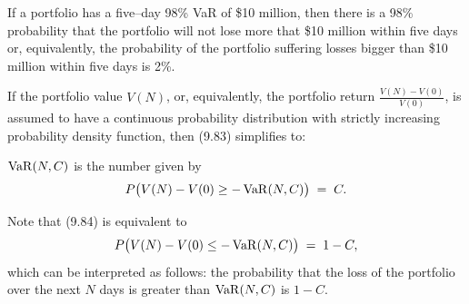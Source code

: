 \begin{examplex}
If a portfolio has a five--day 98\% VaR of \$10 million, then there is a 98\%
probability that the portfolio will not lose more that \$10 million within five days
or, equivalently, the probability of the portfolio suffering losses bigger than \$10
million within five days is 2\%.
\end{examplex}

If the portfolio value $V(N)$, or, equivalently, the portfolio return
$\frac{V(N)-V(0)}{V(0)}$, is assumed to have a continuous probability distribution
with strictly increasing probability density function, then (9.83) simplifies to:

$\operatorname{VaR}(N,C)$ is the number given by
\begin{equation}
P\big(V(N)-V(0) \ge -\operatorname{VaR}(N,C)\big) \;=\; C.
\end{equation}

Note that (9.84) is equivalent to
\begin{equation}
P\big(V(N)-V(0) \le -\operatorname{VaR}(N,C)\big) \;=\; 1-C,
\end{equation}
which can be interpreted as follows: the probability that the loss of the portfolio
over the next $N$ days is greater than $\operatorname{VaR}(N,C)$ is $1-C$.
